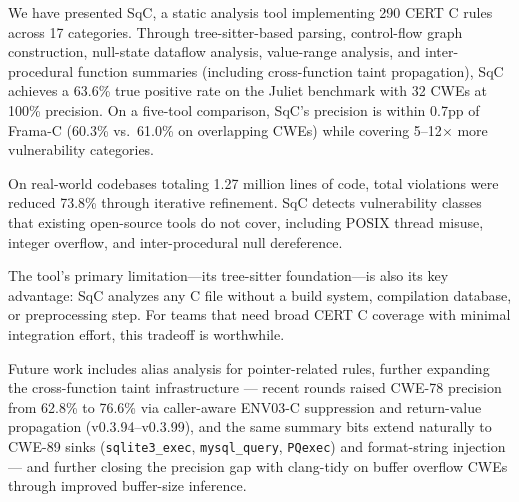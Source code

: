 \documentclass[10pt,twocolumn,letterpaper]{article}
\begin{document}
We have presented SqC, a static analysis tool implementing 290 CERT C
rules across 17 categories.  Through tree-sitter-based parsing,
control-flow graph construction, null-state dataflow analysis,
value-range analysis, and inter-procedural function summaries
(including cross-function taint propagation), SqC achieves a 63.6\%
true positive rate on the Juliet benchmark with 32 CWEs at 100\%
precision.  On a five-tool comparison, SqC's precision is within
0.7pp of Frama-C (60.3\% vs.\ 61.0\% on overlapping CWEs) while
covering 5--12$\times$ more vulnerability categories.

On real-world codebases totaling 1.27 million lines of code, total
violations were reduced 73.8\% through iterative refinement.  SqC
detects vulnerability classes that existing open-source tools do not
cover, including POSIX thread misuse, integer overflow, and
inter-procedural null dereference.

The tool's primary limitation---its tree-sitter foundation---is also
its key advantage: SqC analyzes any C file without a build system,
compilation database, or preprocessing step.  For teams that need
broad CERT C coverage with minimal integration effort, this tradeoff
is worthwhile.

Future work includes alias analysis for pointer-related rules, further
expanding the cross-function taint infrastructure --- recent rounds
raised CWE-78 precision from 62.8\% to 76.6\% via caller-aware ENV03-C
suppression and return-value propagation (v0.3.94--v0.3.99), and the
same summary bits extend naturally to CWE-89 sinks (\texttt{sqlite3\_exec},
\texttt{mysql\_query}, \texttt{PQexec}) and format-string injection ---
and further closing the precision gap with clang-tidy on buffer
overflow CWEs through improved buffer-size inference.


\end{document}
